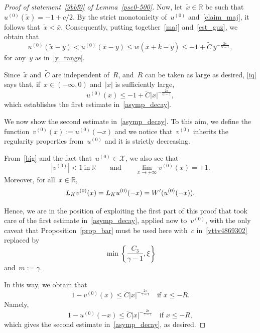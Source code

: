 \documentclass[10pt,a4paper]{amsart}
\numberwithin{equation}{section}
\newcommand{\R}{\mathbb{R}}
\begin{document}
\begin{proof}[Proof of statement~\eqref{9bbf0} of Lemma~\eqref{psc0-500}]
Now, let~$\widetilde x\in\R$ be such that~$u^{(0)}(\widetilde x)= -1+c/2$. By the strict monotonicity of~$u^{(0)}$ and~\eqref{claim_maj}, it follows that~$\widetilde x<\bar{x}$. Consequently, putting together~\eqref{maj} and~\eqref{est_guz}, we obtain that
\begin{equation}\label{iq}
u^{(0)}(\widetilde x-y) < u^{(0)}(\bar{x}-y) \leq w(\bar{x}+\bar{k}-y) \leq -1+\widetilde{C} \, y^{-\frac{2s}{\alpha-1}},
\end{equation}
for any~$y$ as in~\eqref{y_range}.

Since~$\widetilde x$ and~$\widetilde{C}$ are independent of~$R$, and~$R$ can be taken as large as desired, \eqref{iq} says that,
if~$x\in(-\infty,0)$ and~$|x|$ is sufficiently large,
\begin{equation}\label{289dy793736ggd980}
u^{(0)}(x) \leq -1+ \widetilde{C} |x|^{-\frac{2s}{\alpha-1}},
\end{equation}
which establishes the first estimate in~\eqref{asymp_decay}.

We now show the second estimate in~\eqref{asymp_decay}.
To this aim, we define the function~$v^{(0)}(x) := u^{(0)}(-x)$
and we notice that~$v^{(0)}$ inherits the regularity
properties from~$u^{(0)}$ and it is strictly decreasing.

{F}rom~\eqref{big} and the fact that~$u^{(0)}\in{\mathcal{X}}$, we also see that
$$
| v^{(0)}| < 1 \ \mbox{in} \ \R
\qquad\mbox{and}\qquad
\lim_{x\to\pm\infty}v^{(0)}(x)=\mp1 .
$$
Moreover, for all~$x\in\R$,
$$ L_K v^{(0)}(x) = L_K u^{(0)} (-x)=W\rq{}(u^{(0)}(-x)).
$$

Hence, we are in the position of exploiting the first part of this proof that took care of the first estimate in~\eqref{asymp_decay}, applied now to~$v^{(0)}$,
with the only caveat that Proposition~\ref{prop_bar} must be used here with~$c$ in~\eqref{vttv4869302} replaced by
$$ \min\left\{ \frac{C_3}{\gamma-1}, \xi \right\}$$
and~$m:=\gamma$.

In this way, we obtain that
        $$
          1-v^{(0)}(x) \leq \widetilde{C} |x|^{-\frac{2s}{\gamma-1}} \quad\mbox{if } x\leq -R.$$
Namely,
        $$
          1-u^{(0)}(-x) \leq \widetilde{C} |x|^{-\frac{2s}{\gamma-1}} \quad\mbox{if } x\leq -R,$$
which gives the second estimate in~\eqref{asymp_decay}, as desired.
\end{proof}
\end{document}
